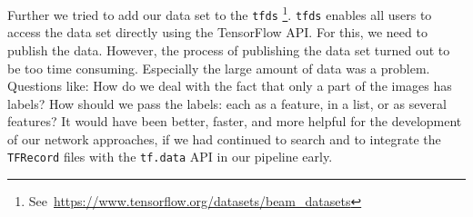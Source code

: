 \bigskip
Further we tried to add our data set to the \texttt{\acrshort{tfds}} \footnote{See~\url{https://www.tensorflow.org/datasets/beam\_datasets}}. \texttt{\acrshort{tfds}} enables all users to access the data set directly using the TensorFlow API. For this, we need to publish the data. However, the process of publishing the data set turned out to be too time consuming. Especially the large amount of data was a problem. Questions like: How do we deal with the fact that only a part of the images has labels? How should we pass the labels: each as a feature, in a list, or as several features? It would have been better, faster, and more helpful for the development of our network approaches, if we had continued to search and to integrate the \texttt{TFRecord} files with the \mbox{\texttt{tf.data}} API in our pipeline early. 
